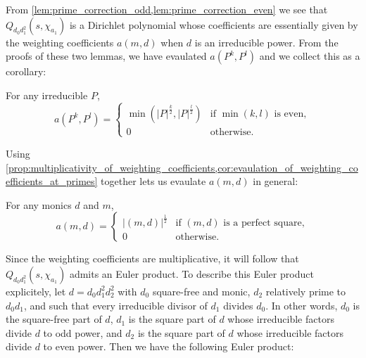 \documentclass[12pt,reqno,oneside]{amsart}
\begin{document}
    From \cref{lem:prime_correction_odd,lem:prime_correction_even} we see that $Q_{d_{0}d_{1}^{2}}(s,\chi_{a_{1}})$ is a Dirichlet polynomial whose coefficients are essentially given by the weighting coefficients $a(m,d)$ when $d$ is an irreducible power. From the proofs of these two lemmas, we have evaulated $a(P^{k},P^{l})$ and we collect this as a corollary:

    \begin{corollary}\label{cor:evaulation_of_weighting_coefficients_at_primes}
        For any irreducible $P$,
        \[
            a(P^{k},P^{l}) = \begin{cases} \min\left(|P|^{\frac{k}{2}},|P|^{\frac{l}{2}}\right) & \text{if $\min(k,l)$ is even}, \\ 0 & \text{otherwise}. \end{cases}
        \]
    \end{corollary}

    Using \cref{prop:multiplicativity_of_weighting_coefficients,cor:evaulation_of_weighting_coefficients_at_primes} together lets us evaulate $a(m,d)$ in general:

    \begin{corollary}\label{cor:evaulation_of_weighting_coefficients_in_general}
        For any monics $d$ and $m$,
        \[
            a(m,d) = \begin{cases} |(m,d)|^{\frac{1}{2}} & \text{if $(m,d)$ is a perfect square}, \\ 0 & \text{otherwise}. \end{cases}
         \]
    \end{corollary}
    
    Since the weighting coefficients are multiplicative, it will follow that $Q_{d_{0}d_{1}^{2}}(s,\chi_{a_{1}})$ admits an Euler product. To describe this Euler product explicitely, let $d = d_{0}d_{1}^{2}d_{2}^{2}$ with $d_{0}$ square-free and monic, $d_{2}$ relatively prime to $d_{0}d_{1}$, and such that every irreducible divisor of $d_{1}$ divides $d_{0}$. In other words, $d_{0}$ is the square-free part of $d$, $d_{1}$ is the square part of $d$ whose irreducible factors divide $d$ to odd power, and $d_{2}$ is the square part of $d$ whose irreducible factors divide $d$ to even power. Then we have the following Euler product:
\end{document}
